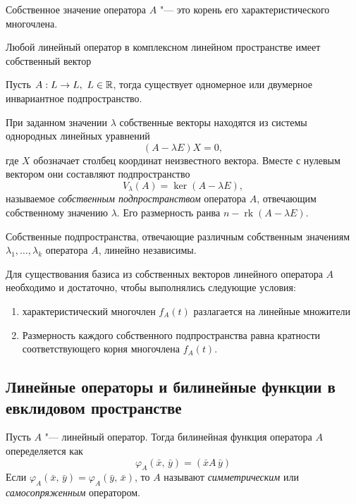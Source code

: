 \begin{theorem}
  Собственное значение оператора $A$ "--- это корень его характеристического многочлена.
\end{theorem}

\begin{theorem}
  Любой линейный оператор в комплексном линейном пространстве имеет собственный вектор
\end{theorem}

\begin{theorem}
  Пусть $A: L \to L,~ L \in \mathbb{R}$, тогда существует одномерное или двумерное инвариантное подпространство.
\end{theorem}

При заданном значении $\lambda$ собственные векторы находятся из системы однородных линейных уравнений
$$
  (A - \lambda E)X = 0,
$$
где $X$ обозначает столбец координат неизвестного вектора. Вместе с нулевым вектором они составляют подпространство
$$
  V_\lambda(A) = \ker(A - \lambda E),
$$
называемое \textit{собственным подпространством} оператора $A$, отвечающим собственному значению $\lambda$. Его размерность ранва $n - \operatorname{rk}(A - \lambda E)$.

\begin{theorem}
  Собственные подпространства, отвечающие различным собственным значениям $\lambda_1, \ldots, \lambda_k$ оператора $A$, линейно независимы.
\end{theorem}

\begin{theorem}
  Для существования базиса из собственных векторов линейного оператора $A$ необходимо и достаточно, чтобы выполнялись следующие условия:
  \begin{enumerate}
    \item характеристический многочлен $f_A(t)$ разлагается на линейные множители
    \item Размерность каждого собственного подпространства равна кратности соответствующего корня многочлена $f_A(t)$.
  \end{enumerate}
\end{theorem}

\subsection*{Линейные операторы и билинейные функции в евклидовом пространстве}
\begin{definition}
  Пусть $A$ "--- линейный оператор. Тогда билинейная функция оператора $A$ опеределяется как
  $$
    \varphi_A(\bar{x}, \, \bar{y}) = (\bar{x} A\, \bar{y}) 
  $$
  Если $\varphi_A(\bar{x}, \, \bar{y}) = \varphi_A(\bar{y},\, \bar{x})$, то $A$ называют \textit{симметрическим} или \textit{самосопряженным} оператором.
\end{definition}

